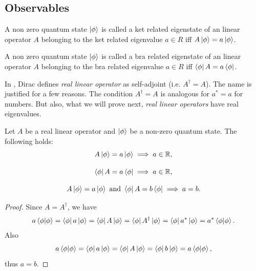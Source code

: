 \documentclass[main.tex]{subfiles}
\begin{document}
\subsection{Observables}

\begin{definition}
A non zero quantum state $\ket{\phi}$ is called a ket related eigenstate of an linear operator $A$ belonging to the ket related eigenvalue $a \in R$ iff $A\ket{\phi} = a\ket{\phi}$.
\end{definition}

\begin{definition}
A non zero quantum state $\ket{\phi}$ is called a bra related eigenstate of an linear operator $A$ belonging to the bra related eigenvalue $a \in R$ iff $\bra{\phi}A = a\bra{\phi}$.
\end{definition}

In \cite{dirac1981}, Dirac defines \textit{real linear operator} as self-adjoint (i.e. $A^\dagger = A$). The name is justified for a few reasons. The condition $A^\dagger = A$ is analogous for $a^* = a$ for numbers. But also, what we will prove next, \textit{real linear operators} have real eigenvalues.

\begin{proposition}
Let $A$ be a real linear operator and $\ket{\phi}$ be a non-zero quantum state. The following holds:
\begin{equation}
A\ket{\phi} = a\ket{\phi} \implies a\in\mathbb{R},
\end{equation}

\begin{equation}
\bra{\phi} A = a\bra{\phi} \implies a\in\mathbb{R},
\end{equation}

\begin{equation}
A\ket{\phi} = a\ket{\phi} \text{ and } \bra{\phi} A = b\bra{\phi} \implies a = b.
\end{equation}

\end{proposition}
\begin{proof}
Since $A = A^\dagger$, we have
\begin{equation}
a\bra{\phi}\ket{\phi} = \bra{\phi} a \ket{\phi} = \bra{\phi} A \ket{\phi} = \bra{\phi} A^\dagger \ket{\phi} = \bra{\phi} a^* \ket{\phi} = a^* \bra{\phi}\ket{\phi}.
\end{equation}
Also
\begin{equation}
a\bra{\phi}\ket{\phi} = \bra{\phi} a \ket{\phi} = \bra{\phi} A \ket{\phi} = \bra{\phi} b \ket{\phi} = a\bra{\phi}\ket{\phi},
\end{equation}
thus $a = b$.
\end{proof}
\end{document}
